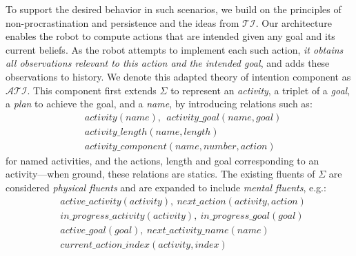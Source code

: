 \documentclass[letterpaper, 10 pt, conference]{article}  %
\newcommand{\stt}[1]{{\small\texttt{#1}}}
\begin{document}
\begin{itemize}
\end{itemize}
To support the desired behavior in such scenarios, we build on the
principles of non-procrastination and persistence and the ideas from
$\mathcal{TI}$. Our architecture enables the robot to compute actions
that are intended given any goal and its current beliefs. As the robot
attempts to implement each such action, \emph{it obtains all
  observations relevant to this action and the intended goal}, and
adds these observations to history. We denote this adapted theory of
intention component as $\mathcal{ATI}$. This component first extends
$\Sigma$ to represent an \emph{activity}, a triplet of a \emph{goal},
a \emph{plan} to achieve the goal, and a \emph{name}, by introducing
relations such as:
\begin{align*}
  &activity(name),~~activity\_goal(name, goal)\\
  &activity\_length(name, length)\\
  &activity\_component(name, number, action)
\end{align*}
for named activities, and the actions, length and goal corresponding
to an activity---when ground, these relations are statics. The
existing fluents of $\Sigma$ are considered \emph{physical fluents}
and are expanded to include \emph{mental fluents}, e.g.:
\begin{align*}
  &active\_activity(activity),~next\_action(activity, action)\\
  &in\_progress\_activity(activity),~in\_progress\_goal(goal)\\
  &active\_goal(goal),~next\_activity\_name(name)\\
  &current\_action\_index(activity, index)
\end{align*}
\end{document}
